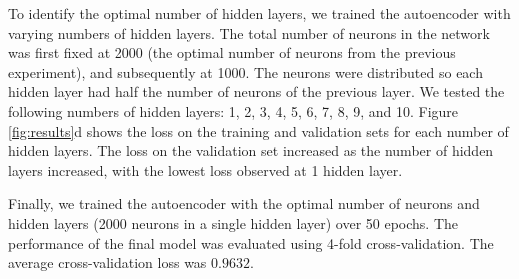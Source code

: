 To identify the optimal number of hidden layers, we trained the autoencoder with varying
numbers of hidden layers. The total number of neurons in the network was first fixed at
2000 (the optimal number of neurons from the previous experiment), and subsequently at
1000. The neurons were distributed so each hidden layer had half the number of neurons
of the previous layer. We tested the following numbers of hidden layers: 1, 2, 3, 4, 5, 6,
7, 8, 9, and 10. Figure \ref{fig:results}d shows the loss on the training and validation
sets for each number of hidden layers. The loss on the validation set increased as the
number of hidden layers increased, with the lowest loss observed at 1 hidden layer.

Finally, we trained the autoencoder with the optimal number of neurons and hidden layers
(2000 neurons in a single hidden layer) over 50 epochs. The performance of the final model
was evaluated using 4-fold cross-validation. The average cross-validation loss was
$0.9632$.
